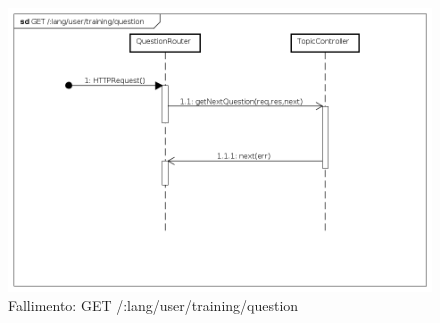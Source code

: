 \begin{itemize}
\begin{figure}[ht]
	\centering
	\includegraphics[scale=0.45]{UML/DiagrammiDiSequenza/Back-end/GET__lang_user_training_question_failure.png}
	\caption{Fallimento: GET /:lang/user/training/question}
\end{figure}
\FloatBarrier

\end{itemize}







